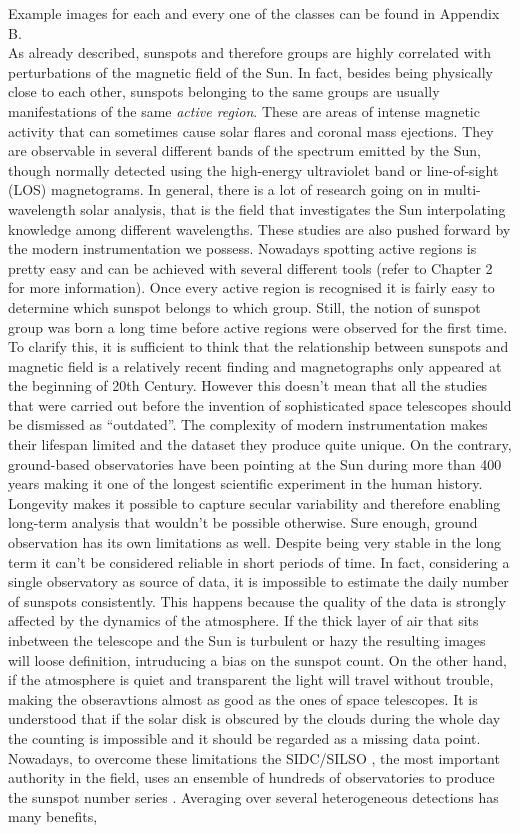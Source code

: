 Example images for each and every one of the classes can be found in Appendix B.\\
As already described, sunspots and therefore groups are highly correlated with perturbations of the magnetic field of the Sun. In fact, besides being physically close to each other, sunspots belonging to the same groups are usually manifestations of the same \textit{active region}. These are areas of intense magnetic activity that can sometimes cause solar flares and coronal mass ejections. They are observable in several different bands of the spectrum emitted by the Sun, though normally detected using the high-energy ultraviolet band or line-of-sight (LOS) magnetograms. In general, there is a lot of research going on in multi-wavelength solar analysis, that is the field that investigates the Sun interpolating knowledge among different wavelengths. These studies are also pushed forward by the modern instrumentation we possess. Nowadays spotting active regions is pretty easy and can be achieved with several different tools (refer to Chapter 2 for more information). Once every active region is recognised it is fairly easy to determine which sunspot belongs to which group. Still, the notion of sunspot group was born a long time before active regions were observed for the first time. To clarify this, it is sufficient to think that the relationship between sunspots and magnetic field is a relatively recent finding and magnetographs only appeared at the beginning of 20th Century. However this doesn't mean that all the studies that were carried out before the invention of sophisticated space telescopes should be dismissed as ``outdated''. The complexity of modern instrumentation makes their lifespan limited and the dataset they produce quite unique. On the contrary, ground-based observatories have been pointing at the Sun during more than 400 years making it one of the longest scientific experiment in the human history. Longevity makes it possible to capture secular variability and therefore enabling long-term analysis that wouldn't be possible otherwise. Sure enough, ground observation has its own limitations as well. Despite being very stable in the long term it can't be considered reliable in short periods of time. In fact, considering a single observatory as source of data, it is impossible to estimate the daily number of sunspots consistently. This happens because the quality of the data is strongly affected by the dynamics of the atmosphere. If the thick layer of air that sits inbetween the telescope and the Sun is turbulent or hazy the resulting images will loose definition, intruducing a bias on the sunspot count. On the other hand, if the atmosphere is quiet and transparent the light will travel without trouble, making the obseravtions almost as good as the ones of space telescopes. It is understood that if the solar disk is obscured by the clouds during the whole day the counting is impossible and it should be regarded as a missing data point. Nowadays, to overcome these limitations the SIDC/SILSO \cite{sidc-silso}, the most important authority in the field, uses an ensemble of hundreds of observatories to produce the sunspot number series \cite{Clette2015}. Averaging over several heterogeneous detections has many benefits, 